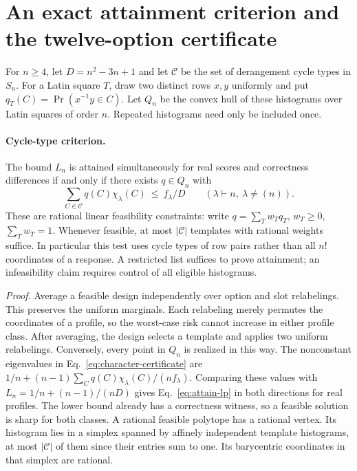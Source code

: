 \section{An exact attainment criterion and the twelve-option certificate}
\label{app:attainment}
For $n\ge4$, let $D=n^2-3n+1$ and let $\mathcal C$ be the set of
derangement cycle types in $S_n$. For a Latin square $T$, draw two
distinct rows $x,y$ uniformly and put $q_T(C)=\Pr(x^{-1}y\in C)$.
Let $Q_n$ be the convex hull of these histograms over Latin squares of
order $n$. Repeated histograms need only be included once.

\paragraph{Cycle-type criterion.}
The bound $L_n$ is attained simultaneously for real scores and
correctness differences if and only if there exists $q\in Q_n$ with
\begin{equation}
 \sum_{C\in\mathcal C} q(C)\chi_\lambda(C)
 \ \le\ f_\lambda/D \qquad(\lambda\vdash n,\ \lambda\ne(n)).
 \label{eq:attain-lp}
\end{equation}
These are rational linear feasibility constraints: write
$q=\sum_T w_Tq_T$, $w_T\ge0$, $\sum_Tw_T=1$.
Whenever feasible, at most $|\mathcal C|$ templates with rational
weights suffice. In particular this test uses cycle types of row
pairs rather than all $n!$ coordinates of a response. A restricted
list suffices to prove attainment; an infeasibility claim requires
control of all eligible histograms.

\emph{Proof.} Average a feasible design independently over option
and slot relabelings. This preserves the uniform marginals. Each
relabeling merely permutes the coordinates of a profile, so the
worst-case risk cannot increase in either profile class. After
averaging, the design selects a template and applies two uniform
relabelings. Conversely, every point in $Q_n$ is realized in this way.
The nonconstant eigenvalues in Eq.~\eqref{eq:character-certificate}
are $1/n+(n-1)\sum_C q(C)\chi_\lambda(C)/(nf_\lambda)$.
Comparing these values with $L_n=1/n+(n-1)/(nD)$ gives
Eq.~\eqref{eq:attain-lp} in both directions for real profiles.
The lower bound already has a correctness witness, so a feasible
solution is sharp for both classes. A rational feasible polytope
has a rational vertex. Its histogram lies in a simplex spanned by
affinely independent template histograms, at most $|\mathcal C|$
of them since their entries sum to one. Its barycentric coordinates
in that simplex are rational.


